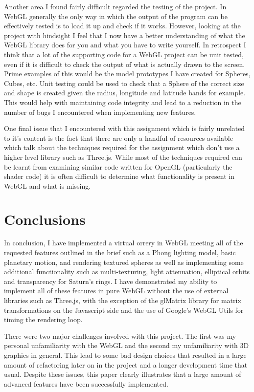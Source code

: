 \documentclass[conference]{IEEEtran}
\begin{document}
Another area I found fairly difficult regarded the testing of the project. In WebGL generally the only way in which the output of the program can be effectively tested is to load it up and check if it works. However, looking at the project with hindsight I feel that I now have a better understanding of what the WebGL library does for you and what you have to write yourself. In retrospect I think that a lot of the supporting code for a WebGL project can be unit tested, even if it is difficult to check the output of what is actually drawn to the screen. Prime examples of this would be the model prototypes I have created for Spheres, Cubes, etc. Unit testing could be used to check that a Sphere of the correct size and shape is created given the radius, longitude and latitude bands for example. This would help with maintaining code integrity and lead to a reduction in the number of bugs I encountered when implementing new features.

One final issue that I encountered with this assignment which is fairly unrelated to it's content is the fact that there are only a handful of resources available which talk about the techniques required for the assignment which don't use a higher level library such as Three.js. While most of the techniques required can be learnt from examining similar code written for OpenGL (particularly the shader code) it is often difficult to determine what functionality is present in WebGL and what is missing.

\section{Conclusions}
\label{sec:conclusions}
In conclusion, I have implemented a virtual orrery in WebGL meeting all of the requested features outlined in the brief such as a Phong lighting model, basic planetary motion, and rendering textured spheres as well as implementing some additional functionality such as multi-texturing, light attenuation, elliptical orbits and transparency for Saturn's rings. I have demonstrated my ability to implement all of these features in pure WebGL without the use of external libraries such as Three.js, with the exception of the glMatrix library \cite{glmatrix} for matrix transformations on the Javascript side and the use of Google's WebGL Utils \cite{webgl-utils} for timing the rendering loop.

There were two major challenges involved with this project. The first was my personal unfamiliarity with the WebGL and the second my unfamiliarity with 3D graphics in general. This lead to some bad design choices that resulted in a large amount of refactoring later on in the project and a longer development time that usual. Despite these issues, this paper clearly illustrates that a large amount of advanced features have been successfully implemented.
\end{document}
